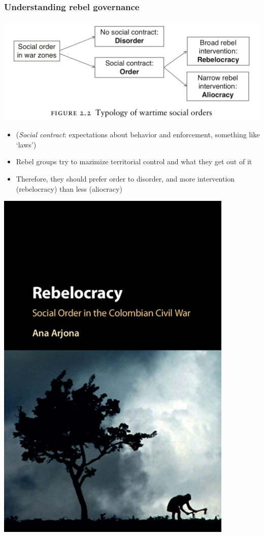 \documentclass[utf8, xcolor=dvipsnames]{beamer}
\begin{document}
\begin{frame}
\frametitle{Understanding rebel governance}
\centering

\begin{minipage}{0.7\textwidth}\centering
  \includegraphics[width = \textwidth]{img/arjona_typology}\\\vspace{10pt}
  \begin{itemize}[<+->]
    \item {\small (\textit{Social contract}: expectations about behavior and enforcement, something like `laws')}
    \item Rebel groups try to mazimize territorial control and what they get out of it
    \item Therefore, they should prefer order to disorder, and more intervention (rebelocracy) than less (aliocracy)
  \end{itemize}
\end{minipage}\hfill
\begin{minipage}{0.29\textwidth}\centering
  \includegraphics[width = 0.85\textwidth]{img/arjona_rebelocracy}\\

\end{minipage}
\end{frame}
\end{document}
